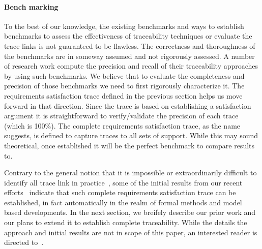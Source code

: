 \paragraph{Bench marking}
To the best of our knowledge, the existing benchmarks and ways to establish benchmarks to assess the effectiveness of traceability techniques or evaluate the trace links is not guaranteed to be flawless. The correctness and thoroughness of the benchmarks are in someway assumed and not rigorously assessed. A number of research work compute the precision and recall of their traceability approaches by using such benchmarks. We believe that to evaluate the completeness and precision of those benchmarks we need to first rigorously characterize it. The requirements satisfaction trace defined in the previous section helps us move forward in that direction. Since the trace is based on establishing a satisfaction argument it is straightforward to verify/validate the precision of each trace (which is 100$\%$). The complete requirements satisfaction trace, as the name suggests, is defined to capture traces to all sets of support. While this may sound theoretical, once established it will be the perfect benchmark to compare results to.

Contrary to the general notion that it is impossible or extraordinarily difficult to identify all trace link in practice~\cite{stravsunskas2002traceability}, some of the initial results from our recent efforts~\cite{IVCTechReport} indicate that such complete requirements satisfaction trace can be established, in fact automatically in the realm of formal methods and model based developments. In the next section, we breifely describe our prior work and our plans to extend it to establish complete traceability. While the details the approach and initial results are not in scope of this paper, an interested reader is directed to~\cite{IVCTechReport}.



